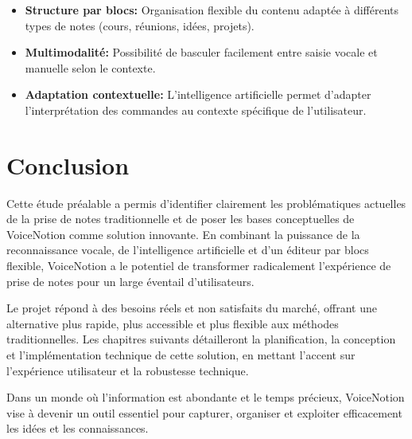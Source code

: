 \begin{itemize}
    \item \textbf{Structure par blocs:} Organisation flexible du contenu adaptée à différents types de notes (cours, réunions, idées, projets).
    
    \item \textbf{Multimodalité:} Possibilité de basculer facilement entre saisie vocale et manuelle selon le contexte.
    
    \item \textbf{Adaptation contextuelle:} L'intelligence artificielle permet d'adapter l'interprétation des commandes au contexte spécifique de l'utilisateur.
\end{itemize}


\section{Conclusion}

Cette étude préalable a permis d'identifier clairement les problématiques actuelles de la prise de notes traditionnelle et de poser les bases conceptuelles de VoiceNotion comme solution innovante. En combinant la puissance de la reconnaissance vocale, de l'intelligence artificielle et d'un éditeur par blocs flexible, VoiceNotion a le potentiel de transformer radicalement l'expérience de prise de notes pour un large éventail d'utilisateurs.

Le projet répond à des besoins réels et non satisfaits du marché, offrant une alternative plus rapide, plus accessible et plus flexible aux méthodes traditionnelles. Les chapitres suivants détailleront la planification, la conception et l'implémentation technique de cette solution, en mettant l'accent sur l'expérience utilisateur et la robustesse technique.

Dans un monde où l'information est abondante et le temps précieux, VoiceNotion vise à devenir un outil essentiel pour capturer, organiser et exploiter efficacement les idées et les connaissances. 